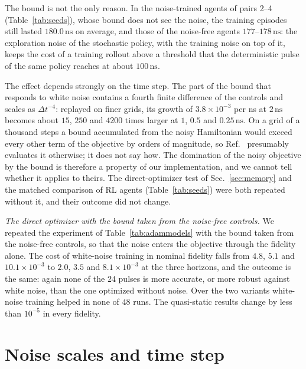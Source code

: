 \documentclass[aps,prx,twocolumn,superscriptaddress,nofootinbib,amsmath,amssymb,floatfix]{revtex4-2}
\newcommand{\ns}{\,\mathrm{ns}}
\begin{document}
The bound is not the only reason. In the noise-trained agents of pairs 2--4 (Table~\ref{tab:seeds}),
whose bound does not see the noise, the training episodes
still lasted $180.0\ns$ on average, and those of the noise-free agents $177$--$178\ns$: the exploration
noise of the stochastic policy, with the training noise on top of it, keeps the cost of a training rollout
above a threshold that the deterministic pulse of the same policy reaches at about $100\ns$.

The effect depends strongly on the time step. The part of the bound that responds to white noise
contains a fourth finite difference of the controls and scales as
$\Delta t^{-4}$: replayed on finer grids, its growth of $3.8\times10^{-3}$ per ns at $2\ns$ becomes about $15$,
$250$ and $4200$ times larger at $1$, $0.5$ and $0.25\ns$. On a grid of a thousand steps a bound
accumulated from the noisy Hamiltonian would exceed every other term of the objective by orders of
magnitude, so Ref.~\cite{Niu2019} presumably evaluates it otherwise; it does not say how. The domination
of the noisy objective by the bound is therefore a property of our implementation, and we cannot tell
whether it applies to theirs. The direct-optimizer test of Sec.~\ref{sec:memory} and the matched
comparison of RL agents (Table~\ref{tab:seeds}) were both repeated without it, and their outcome did not
change.

\emph{The direct optimizer with the bound taken from the noise-free controls.} We repeated the experiment
of Table~\ref{tab:adammodels} with the bound taken from the noise-free controls, so that the noise enters
the objective through the fidelity alone. The cost of white-noise training in nominal fidelity falls from
$4.8$, $5.1$ and $10.1\times10^{-3}$ to $2.0$, $3.5$ and $8.1\times10^{-3}$ at the three horizons, and the
outcome is the same: again none of the $24$ pulses is more accurate, or more robust against white noise,
than the one optimized without noise. Over the two variants white-noise training helped in none of $48$
runs. The quasi-static results change by less than $10^{-5}$ in every fidelity.

\section{Noise scales and time step}
\label{app:scales}
\end{document}
